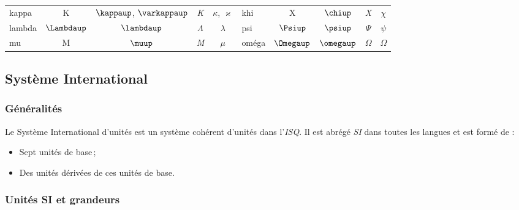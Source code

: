 \begin{table}[h!]
\begin{tabularx}{\textwidth}[t]{l C C C C l C C C C}
kappa					& K						& $\kappaup$, $\varkappaup$				& \textit{K}							& $\kappa$, $\varkappa$ 		& khi						& X						& $\chiup$												& \textit{X}							& $\chi$ \\
lambda					& $\Lambdaup$		& $\lambdaup$										& $\mathit{\Lambda}$			& $\lambda$							& psi						& $\Psiup$				& $\psiup$												& $\mathit{\Psi}$					& $\psi$ \\
mu						& M						& $\muup$											& \textit{M}							& $\mu$								& oméga					& $\Omegaup$		& $\omegaup$										& $\mathit{\Omega}$			& $\Omega$ \\
\cmidrule[\heavyrulewidth](lr){1-5} \cmidrule[\heavyrulewidth](lr){6-10}
\end{tabularx}
\end{table}


\subsection{Système International}
\label{subsec:systeme_international}

\subsubsection{Généralités}

Le Système International d'unités est un système cohérent d'unités dans l'\emph{ISQ}. Il est abrégé \emph{SI} dans toutes les langues et est formé de :
\begin{itemize}
\item Sept unités de base\,;
\item Des unités dérivées de ces unités de base.
\end{itemize}

\subsubsection{Unités SI et grandeurs}

